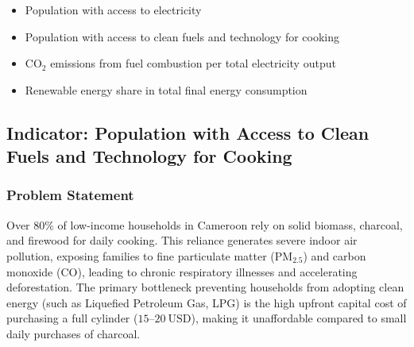 \documentclass[11pt, a4paper]{article}
\begin{document}
\begin{itemize}
  \item Population with access to electricity
  \item Population with access to clean fuels and technology for cooking
  \item $\text{CO}_2$ emissions from fuel combustion per total electricity output
  \item Renewable energy share in total final energy consumption
\end{itemize}

\subsection{Indicator: Population with Access to Clean Fuels and Technology for Cooking}

\subsubsection*{Problem Statement}
Over $80\%$ of low-income households in Cameroon rely on solid biomass, charcoal, and firewood for daily cooking. This reliance generates severe indoor air pollution, exposing families to fine particulate matter ($\text{PM}_{2.5}$) and carbon monoxide ($\text{CO}$), leading to chronic respiratory illnesses and accelerating deforestation. The primary bottleneck preventing households from adopting clean energy (such as Liquefied Petroleum Gas, LPG) is the high upfront capital cost of purchasing a full cylinder ($15\text{--}20~\text{USD}$), making it unaffordable compared to small daily purchases of charcoal.
\end{document}
